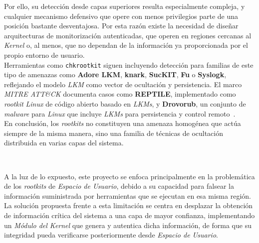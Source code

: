 Por ello, su detección desde capas superiores resulta especialmente compleja, y cualquier mecanismo defensivo que opere con menos privilegios parte de una posición bastante desventajosa.
Por esta razón existe la necesidad de diseñar arquitecturas de monitorización autenticadas, que operen en regiones cercanas al \textit{Kernel} o, al menos, que no dependan de la información ya proporcionada por el propio entorno de usuario.\\

Herramientas como \texttt{chkrootkit} siguen incluyendo detección para familias de este tipo de amenazas como \textbf{Adore LKM}, \textbf{knark}, \textbf{SucKIT}, \textbf{Fu} o \textbf{Syslogk}, reflejando el modelo \textit{LKM} como vector de ocultación y persistencia.
El marco \textit{MITRE ATT\&CK} documenta casos como \textbf{REPTILE}, implementado como \textit{rootkit} \textit{Linux} de código abierto basado en \textit{LKMs}, y \textbf{Drovorub}, un conjunto de \textit{malware} para \textit{Linux} que incluye \textit{LKMs} para persistencia y control remoto~\cite{chkrootkit_man}.\\


En conclusión, los \textit{rootkits} no constituyen una amenaza homogénea que actúa siempre de la misma manera, sino una familia de técnicas de ocultación distribuida en varias capas del sistema.\\

\newpage

\

\vfill

A la luz de lo expuesto, este proyecto se enfoca principalmente en la problemática de los \textit{rootkits} de \textit{Espacio de Usuario}, debido a su capacidad para falsear la información suministrada por herramientas que se ejecutan en esa misma región.
La solución propuesta frente a esta limitación se centra en desplazar la obtención de información crítica del sistema a una capa de mayor confianza, implementando un \textit{Módulo del Kernel} que genera y autentica dicha información, de forma que su integridad pueda verificarse posteriormente desde \textit{Espacio de Usuario}.
